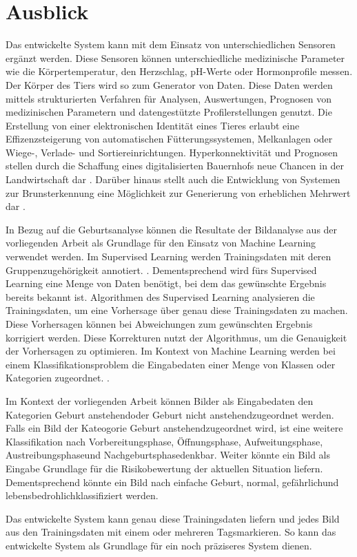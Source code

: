 

\chapter{Ausblick}
Das entwickelte System kann mit dem Einsatz von unterschiedlichen Sensoren ergänzt werden. Diese Sensoren können unterschiedliche medizinische Parameter wie die Körpertemperatur, den Herzschlag,  pH-Werte oder Hormonprofile messen. Der Körper des Tiers wird so zum Generator von Daten. Diese Daten werden mittels strukturierten Verfahren für Analysen, Auswertungen, Prognosen von medizinischen Parametern und datengestützte Profilerstellungen genutzt. Die Erstellung von einer elektronischen Identität eines Tieres erlaubt eine Effizenzsteigerung von automatischen Fütterungssystemen, Melkanlagen oder Wiege-, Verlade- und Sortiereinrichtungen. Hyperkonnektivität und Prognosen stellen durch die Schaffung eines digitalisierten Bauernhofs neue Chancen in der Landwirtschaft dar \citep[S. 308 ff.]{Kasprowicz2019}. Darüber hinaus stellt auch die Entwicklung von Systemen zur Brunsterkennung eine Möglichkeit zur Generierung von erheblichen Mehrwert dar \cite{Hirsbrunner2020}.


In Bezug auf die Geburtsanalyse können die Resultate der Bildanalyse aus der vorliegenden Arbeit als Grundlage für den Einsatz von Machine Learning verwendet werden.
Im Supervised Learning werden Trainingsdaten mit deren Gruppenzugehörigkeit annotiert. \citep[S. 253]{Firouzi2020}. 
Dementsprechend wird fürs Supervised Learning eine Menge von Daten benötigt, bei dem das gewünschte Ergebnis bereits bekannt ist. Algorithmen des Supervised Learning analysieren die Trainingsdaten, um eine Vorhersage über genau diese Trainingsdaten zu machen. Diese Vorhersagen können bei Abweichungen zum gewünschten Ergebnis korrigiert werden. Diese Korrekturen nutzt der Algorithmus, um die Genauigkeit der Vorhersagen zu optimieren. Im Kontext von Machine Learning werden bei einem Klassifikationsproblem die Eingabedaten einer Menge von Klassen oder Kategorien zugeordnet. \citep[S. 440]{FernandezVillan2019}.

Im Kontext der vorliegenden Arbeit können Bilder als Eingabedaten den Kategorien \flqq Geburt anstehend\frqq oder \flqq Geburt nicht anstehend\frqq zugeordnet werden. Falls ein Bild der Kateogorie \flqq Geburt anstehend\frqq zugeordnet wird, ist eine weitere Klassifikation nach \flqq Vorbereitungsphase\frqq, \flqq Öffnungsphase\frqq, \flqq Aufweitungsphase\frqq, \flqq Austreibungsphase\frqq und \flqq Nachgeburtsphase\frqq denkbar. Weiter könnte ein Bild als Eingabe Grundlage für die Risikobewertung der aktuellen Situation liefern. Dementsprechend könnte ein Bild nach \flqq einfache Geburt\frqq, \flqq normal\frqq, \flqq gefährlich\frqq und \flqq lebensbedrohlich\frqq klassifiziert werden. 

Das entwickelte System kann genau diese Trainingsdaten liefern und jedes Bild aus den Trainingsdaten mit einem oder mehreren \flqq Tags\frqq markieren. So kann das entwickelte System als Grundlage für ein noch präziseres System dienen.
